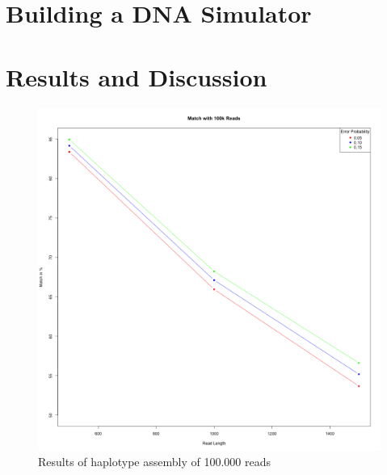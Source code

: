 \documentclass[10pt,a4paper]{article}
\begin{document}
\section{Building a DNA Simulator}
\section{Results and Discussion}

\begin{figure}[h!]
\centering
\includegraphics[width=\textwidth]{../output/plots/plot100k}
\caption{Results of haplotype assembly of 100.000 reads}
\end{figure}
\end{document}
